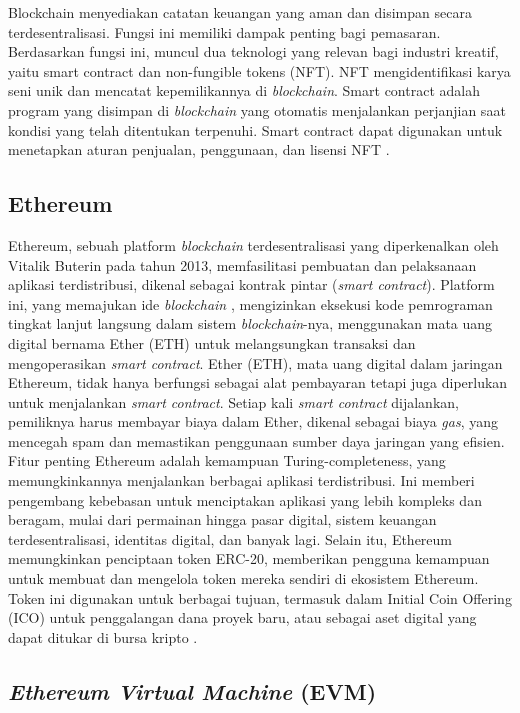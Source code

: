 Blockchain menyediakan catatan keuangan yang aman dan disimpan secara terdesentralisasi. Fungsi ini memiliki dampak penting bagi pemasaran. Berdasarkan fungsi ini, muncul dua teknologi yang relevan bagi industri kreatif, yaitu smart contract dan non-fungible tokens (NFT). NFT mengidentifikasi karya seni unik dan mencatat kepemilikannya di \emph{blockchain}. Smart contract adalah program yang disimpan di \emph{blockchain} yang otomatis menjalankan perjanjian saat kondisi yang telah ditentukan terpenuhi. Smart contract dapat digunakan untuk menetapkan aturan penjualan, penggunaan, dan lisensi NFT \cite{Malik2023}.

\subsection{Ethereum}

Ethereum, sebuah platform \emph{blockchain} terdesentralisasi yang diperkenalkan oleh Vitalik Buterin pada tahun 2013, memfasilitasi pembuatan dan pelaksanaan aplikasi terdistribusi, dikenal sebagai kontrak pintar (\emph{smart contract}). Platform ini, yang memajukan ide \emph{blockchain} , mengizinkan eksekusi kode pemrograman tingkat lanjut langsung dalam sistem \emph{blockchain}-nya, menggunakan mata uang digital bernama Ether (ETH) untuk melangsungkan transaksi dan mengoperasikan \emph{smart contract}. Ether (ETH), mata uang digital dalam jaringan Ethereum, tidak hanya berfungsi sebagai alat pembayaran tetapi juga diperlukan untuk menjalankan \emph{smart contract}. Setiap kali \emph{smart contract} dijalankan, pemiliknya harus membayar biaya dalam Ether, dikenal sebagai biaya \emph{gas}, yang mencegah spam dan memastikan penggunaan sumber daya jaringan yang efisien. Fitur penting Ethereum adalah kemampuan Turing-completeness, yang memungkinkannya menjalankan berbagai aplikasi terdistribusi. Ini memberi pengembang kebebasan untuk menciptakan aplikasi yang lebih kompleks dan beragam, mulai dari permainan hingga pasar digital, sistem keuangan terdesentralisasi, identitas digital, dan banyak lagi. Selain itu, Ethereum memungkinkan penciptaan token ERC-20, memberikan pengguna kemampuan untuk membuat dan mengelola token mereka sendiri di ekosistem Ethereum. Token ini digunakan untuk berbagai tujuan, termasuk dalam Initial Coin Offering (ICO) untuk penggalangan dana proyek baru, atau sebagai aset digital yang dapat ditukar di bursa kripto \cite{Antonopoulos2018}.

\subsection{\emph{Ethereum Virtual Machine} (EVM)}

